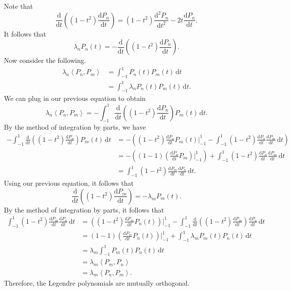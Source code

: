 \documentclass[11pt, letterpaper]{report}
\begin{document}
Note that
\[
	\frac{\mathrm{d}}{\mathrm{d}t} \left( \left( 1-t^2 \right) \frac{\mathrm{d}P_n}{\mathrm{d}t}  \right) =\left( 1-t^2 \right) \frac{\mathrm{d}^2P_n}{\mathrm{d}t^2} -2t \frac{\mathrm{d}P_n}{\mathrm{d}t} 
.\]
It follows that
\[
	\lambda_nP_n(t)=-\frac{\mathrm{d}}{\mathrm{d}t} \left( \left( 1-t^2 \right) \frac{\mathrm{d}P_n}{\mathrm{d}t}  \right)
.\]
Now consider the following.
\begin{align*}
	\lambda_n \left\langle P_n,P_m \right\rangle &=\int_{-1}^{1} P_n(t)P_m(t) \,\mathrm{d} t\\
						     &=\int_{-1}^{1} \lambda_nP_n(t)P_m(t) \,\mathrm{d} t
.\end{align*}
We can plug in our previous equation to obtain
\[
	\lambda_n \left\langle P_n,P_m \right\rangle =-\int_{-1}^{1} \frac{\mathrm{d}}{\mathrm{d}t} \left( \left( 1-t^2 \right) \frac{\mathrm{d}P_n}{\mathrm{d}t}  \right) P_m(t) \,\mathrm{d} t
.\]
By the method of integration by parts, we have
\begin{align*}
	-\int_{-1}^{1} \frac{\mathrm{d}}{\mathrm{d}t} \left( \left( 1-t^2 \right) \frac{\mathrm{d}P_n}{\mathrm{d}t}  \right) P_m(t) \,\mathrm{d} t&=-\left( \left( 1-t^2 \right) \frac{\mathrm{d}P_n}{\mathrm{d}t} P_m(t)\bigg\vert_{-1}^1-\int_{-1}^{1} \left( 1-t^2 \right) \frac{\mathrm{d}P_n}{\mathrm{d}t} \frac{\mathrm{d}P_m}{\mathrm{d}t}  \,\mathrm{d} t \right) \\																		  &=-\left( (1-1)\left( \frac{\mathrm{d}P_n}{\mathrm{d}t} P_m \right)\bigg\vert_{-1}^1 \right) +\int_{-1}^{1} \left( 1-t^2 \right) \frac{\mathrm{d}P_n}{\mathrm{d}t} \frac{\mathrm{d}P_m}{\mathrm{d}t}  \,\mathrm{d} t\\
																		  &=\int_{-1}^{1} \left( 1-t^2 \right) \frac{\mathrm{d}P_m}{\mathrm{d}t} \frac{\mathrm{d}P_n}{\mathrm{d}t}  \,\mathrm{d} t
.\end{align*}
Using our previous equation, it follows that
\[
	\frac{\mathrm{d}}{\mathrm{d}t} \left( \left( 1-t^2 \right) \frac{\mathrm{d}P_m}{\mathrm{d}t}  \right) =-\lambda_mP_m(t)
.\]
By the method of integration by parts, it follows that
\begin{align*}
	\int_{-1}^{1} \left( 1-t^2 \right) \frac{\mathrm{d}P_m}{\mathrm{d}t} \frac{\mathrm{d}P_n}{\mathrm{d}t}  \,\mathrm{d} t&=\left( \left( 1-t^2 \right) \frac{\mathrm{d}P_m}{\mathrm{d}t} P_n(t) \right)\bigg\vert_{-1}^1-\int_{-1}^{1} \frac{\mathrm{d}}{\mathrm{d}t} \left(\left( 1-t^2 \right) \frac{\mathrm{d}P_m}{\mathrm{d}t} \right) \frac{\mathrm{d}P_n}{\mathrm{d}t}  \,\mathrm{d} t\\
															      &=(1-1)\left( \frac{\mathrm{d}P_m}{\mathrm{d}t} P_n(t) \right) \bigg\vert_{-1}^1 +\int_{-1}^{1} \lambda_mP_m(t)P_n(t) \,\mathrm{d} t\\
															      &=\lambda_m\int_{-1}^{1} P_m(t)P_n(t) \,\mathrm{d} t\\
															      &=\lambda_m \left\langle P_m,P_n \right\rangle \\
															      &=\lambda_m\left\langle P_n,P_m \right\rangle 
.\end{align*}
Therefore, the Legendre polynomials are mutually orthogonal.
\end{document}
